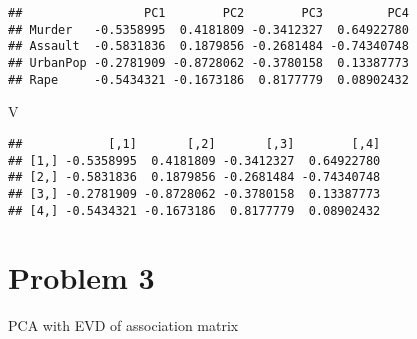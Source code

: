 \documentclass[]{article}
\newenvironment{Shaded}{\begin{snugshade}}{\end{snugshade}}
\newcommand{\KeywordTok}[1]{\textcolor[rgb]{0.13,0.29,0.53}{\textbf{#1}}}
\newcommand{\DataTypeTok}[1]{\textcolor[rgb]{0.13,0.29,0.53}{#1}}
\newcommand{\DecValTok}[1]{\textcolor[rgb]{0.00,0.00,0.81}{#1}}
\newcommand{\StringTok}[1]{\textcolor[rgb]{0.31,0.60,0.02}{#1}}
\newcommand{\CommentTok}[1]{\textcolor[rgb]{0.56,0.35,0.01}{\textit{#1}}}
\newcommand{\ControlFlowTok}[1]{\textcolor[rgb]{0.13,0.29,0.53}{\textbf{#1}}}
\newcommand{\OperatorTok}[1]{\textcolor[rgb]{0.81,0.36,0.00}{\textbf{#1}}}
\newcommand{\NormalTok}[1]{#1}
\begin{document}
\begin{Shaded}
\end{Shaded}

\begin{verbatim}
##                 PC1        PC2        PC3         PC4
## Murder   -0.5358995  0.4181809 -0.3412327  0.64922780
## Assault  -0.5831836  0.1879856 -0.2681484 -0.74340748
## UrbanPop -0.2781909 -0.8728062 -0.3780158  0.13387773
## Rape     -0.5434321 -0.1673186  0.8177779  0.08902432
\end{verbatim}

\begin{Shaded}
\begin{Highlighting}[]
\NormalTok{V}
\end{Highlighting}
\end{Shaded}

\begin{verbatim}
##            [,1]       [,2]       [,3]        [,4]
## [1,] -0.5358995  0.4181809 -0.3412327  0.64922780
## [2,] -0.5831836  0.1879856 -0.2681484 -0.74340748
## [3,] -0.2781909 -0.8728062 -0.3780158  0.13387773
## [4,] -0.5434321 -0.1673186  0.8177779  0.08902432
\end{verbatim}

\section*{Problem 3}

PCA with EVD of association matrix

\begin{Shaded}
\end{Shaded}
\end{document}
